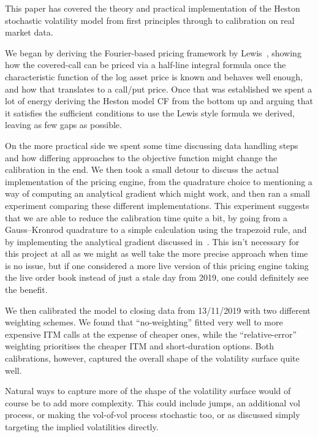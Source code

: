 
This paper has covered the theory and practical implementation of the Heston stochastic volatility model from first principles through to calibration on real market data.

We began by deriving the Fourier-based pricing framework by Lewis~\cite{lewis2001}, showing how the covered-call can be priced via a half-line integral formula once the characteristic function of the log asset price is
known and behaves well enough, and how that translates to a call/put price. Once that was established we spent a lot of energy deriving the Heston model CF from the bottom up and arguing that it satisfies the sufficient conditions to
use the Lewis style formula we derived, leaving as few gaps as possible.

On the more practical side we spent some time discussing data handling steps and how differing approaches to the objective function might change the calibration in the end. We then took a small detour to discuss the actual implementation of the pricing engine, from the quadrature choice to mentioning
a way of computing an analytical gradient which might work, and then ran a small experiment comparing these different implementations. This experiment suggests that we are able to reduce the calibration time quite a bit, by going from a Gauss--Kronrod quadrature to a simple calculation using the trapezoid rule,
and by implementing the analytical gradient discussed in~\cite{germano2017}. This isn't necessary for this project at all as we might as well take the more precise approach when time is no issue, but if one considered a
more live version of this pricing engine taking the live order book instead of just a stale day from 2019, one could definitely see the benefit.

We then calibrated the model to closing data from 13/11/2019 with two different weighting schemes. We found that ``no-weighting'' fitted very well to more expensive ITM calls at the expense of cheaper ones, while the ``relative-error''
weighting prioritises the cheaper ITM and short-duration options. Both calibrations, however, captured the overall shape of the volatility surface quite well.

Natural ways to capture more of the shape of the volatility surface would of course be to add more complexity. This could include jumps, an additional vol process, or making the vol-of-vol process stochastic too, or as discussed simply targeting the implied volatilities directly.
 



